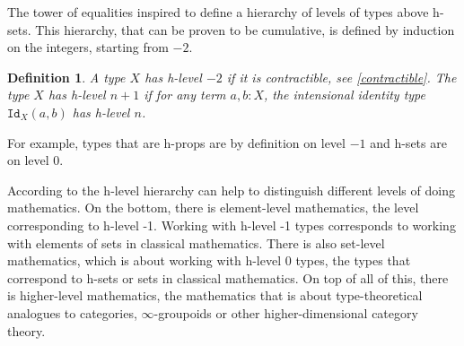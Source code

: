 \documentclass[12pt,a4paper,twoside,xetex]{book} %
\newcommand{\keyword}[1]{\emph{#1}\index{#1}}
\newtheorem{definition}[theorem]{Definition}
\newtheorem{example}[theorem]{Example}
\begin{document}
The tower of equalities inspired \cite{Voevodsky2016} to define a hierarchy of 
levels of types above h-sets. This hierarchy, that can be proven to be 
cumulative, is defined by induction on the integers, starting from $-2$. 

\begin{definition}\label{hlevel}
A type $X$ has \keyword{h-level} $-2$ if it is contractible, see \cref{contractible}. The type $X$ has h-level 
$n+1$ if for any term $a,b:X$, the intensional identity type $\texttt{Id}_X(a,b)$ 
has h-level $n$.
\end{definition}


For example, types that are h-props are by definition on level $-1$ and h-sets are on 
level $0$. 

% 
% 
% 

According to \cite{Voevodsky2016} the h-level hierarchy can help to distinguish 
different levels of doing mathematics. On the bottom, there is element-level 
mathematics, the level corresponding to h-level -1. Working with  h-level -1 
types corresponds to working with elements of sets in classical mathematics. 
There is also set-level mathematics, which is about working with h-level 0 
types, the types that correspond to h-sets or sets in classical mathematics. On 
top of all of this, there is higher-level mathematics, the mathematics that is 
about type-theoretical analogues to categories, $\infty$-groupoids or other 
higher-dimensional category theory.
\end{document}
